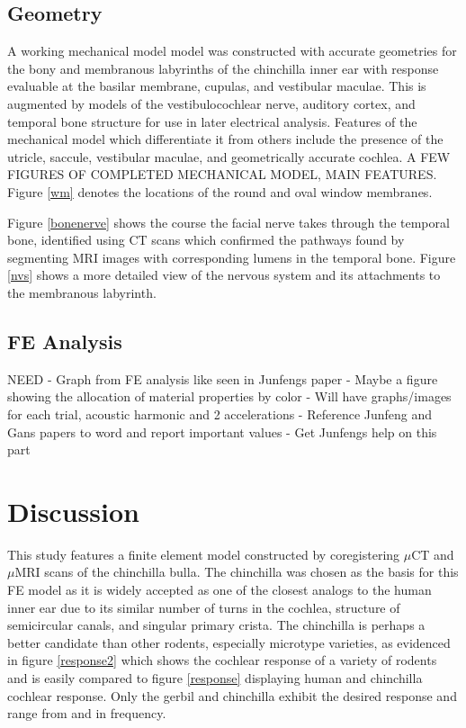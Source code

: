 \documentclass[12pt]{article}
\begin{document}
\subsection{Geometry}
A working mechanical model model was constructed with accurate geometries for the bony and membranous labyrinths of the chinchilla inner ear with response evaluable at the basilar membrane, cupulas, and vestibular maculae. This is augmented by models of the vestibulocochlear nerve, auditory cortex, and temporal bone structure for use in later electrical analysis. Features of the mechanical model which differentiate it from others include the presence of the utricle, saccule, vestibular maculae, and geometrically accurate cochlea. A FEW FIGURES OF COMPLETED MECHANICAL MODEL, MAIN FEATURES. Figure \ref{wm} denotes the locations of the round and oval window membranes.


Figure \ref{bonenerve} shows the course the facial nerve takes through the temporal bone, identified using CT scans which confirmed the pathways found by segmenting MRI images with corresponding lumens in the temporal bone. Figure \ref{nvs} shows a more detailed view of the nervous system and its attachments to the membranous labyrinth.


\subsection{FE Analysis}
NEED \newline - Graph from FE analysis like seen in Junfengs paper
- Maybe a figure showing the allocation of material properties by color
- Will have graphs/images for each trial, acoustic harmonic and 2 accelerations
- Reference Junfeng and Gans papers to word and report important values
- Get Junfengs help on this part



\section{Discussion}\label{discussion}
This study features a finite element model constructed by coregistering $\mu$CT and $\mu$MRI scans of the chinchilla bulla. The chinchilla was chosen as the basis for this FE model as it is widely accepted as one of the closest analogs to the human inner ear due to its similar number of turns in the cochlea, structure of semicircular canals, and singular primary crista. \cite{trevino:chinchmodel} The chinchilla is perhaps a better candidate than other rodents, especially microtype varieties, as evidenced in figure \ref{response2} which shows the cochlear response of a variety of rodents and is easily compared to figure \ref{response} displaying human and chinchilla cochlear response. Only the gerbil and chinchilla exhibit the desired response and range from and in frequency. \cite{mason}
\end{document}
